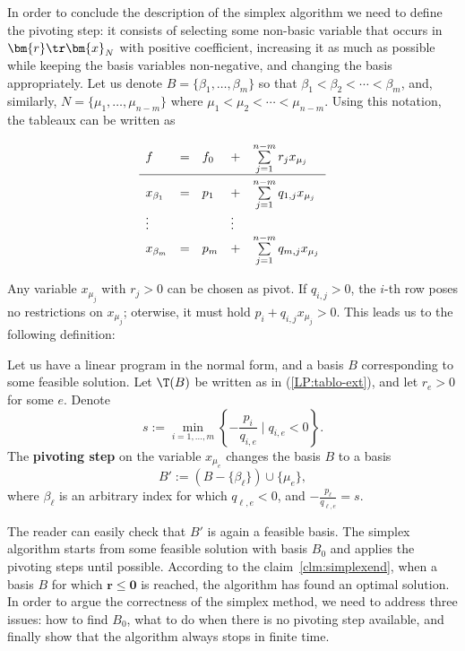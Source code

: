\noindent
In order to conclude the description of the simplex algorithm we need to define the pivoting step:
it consists of selecting some non-basic variable that occurs in  $\bm{r}\tr\bm{x}_N$ with positive
coefficient, increasing it as much as possible while keeping the basis variables non-negative, and
changing the basis appropriately. Let us denote
$B=\{\beta_1,\ldots,\beta_m\}$ so that $\beta_1<\beta_2<\cdots<\beta_m$,
and, similarly, $N=\{\mu_1,\ldots,\mu_{n-m}\}$ where $\mu_1<\mu_2<\cdots<\mu_{n-m}$.
Using this notation, the tableaux can be written as

\begin{equation}
  \label{LP:tablo-ext}
\begin{array}{lllll}
  f & = & f_0 & + & \sum\limits_{j=1}^{n-m} r_jx_{\mu_j}\\[2mm]\hline\rule{0mm}{4ex}
  x_{\beta_1} & = & p_1 & + & \sum\limits_{j=1}^{n-m}q_{1,j}x_{\mu_j}\\
    \vdots    &  & & \vdots\\
  x_{\beta_m} & = & p_m & + & \sum\limits_{j=1}^{n-m}q_{m,j}x_{\mu_j}\\
\end{array}
\end{equation}

\noindent
Any variable  $x_{\mu_j}$ with  $r_j>0$ can be chosen as pivot. If $q_{i,j}>0$, the $i$-th
row poses no restrictions on  $x_{\mu_j}$; oterwise, it must hold
$p_i+q_{i,j}x_{\mu_j}>0$.
This leads us to the following definition:


\begin{framed}
  \begin{dfn}
    \label{dfn:LP:pivot}
    Let us have a linear program in the normal form, and a basis $B$ corresponding to some feasible solution.
    Let $\T(B)$ be written as in (\ref{LP:tablo-ext}), and let $r_e>0$ for some $e$.
    Denote $$s:=\min_{i=1,\ldots,m}\left\{-\frac{p_i}{q_{i,e}}\mid q_{i,e}<0\right\}.$$
    The {\bfseries pivoting step} on the variable $x_{\mu_e}$ changes the basis $B$ to a basis
     $$B':=\left(B-\{\beta_\ell\}\right)\cup\{\mu_e\},$$
     where $\beta_\ell$ is an arbitrary index for which
    $q_{\ell,e}<0$, and
      $-\frac{p_\ell}{q_{\ell,e}} =s$.
  \end{dfn}
\end{framed}


\noindent
The reader can easily check that $B'$ is again a feasible basis. The simplex algorithm starts from some
feasible solution with basis $B_0$ and applies the pivoting steps until possible. According to
the claim~\ref{clm:simplexend}, when a basis $B$ for which  $\bm{r}\le\bm{0}$ is reached,
the algorithm has found an optimal solution. In order to argue the correctness of the simplex method,
we need to address three issues: how to find $B_0$, what to do when there is no pivoting step available, 
and finally show that the algorithm always stops in finite time.

